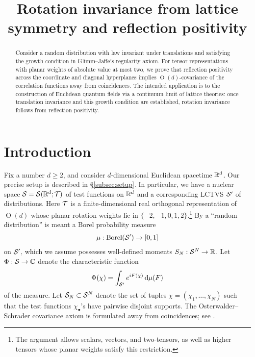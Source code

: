 \newcommand{\dd}{\,\mathrm{d}}
\newcommand{\supp}{\operatorname{supp}}



\title[Rotation invariance from lattice symmetry]{Rotation invariance from lattice symmetry and reflection positivity}
\date{}


	
\begin{abstract}
    Consider a random distribution with law invariant under translations and satisfying the growth condition in Glimm--Jaffe's regularity axiom. For tensor representations with planar weights of absolute value at most two, we prove that reflection positivity across the coordinate and diagonal hyperplanes implies $\operatorname{O}(d)$-covariance of the correlation functions away from coincidences. The intended application is to the construction of Euclidean quantum fields via a continuum limit of lattice theories: once translation invariance and this growth condition are established, rotation invariance follows from reflection positivity. 
\end{abstract}	

\maketitle

\tableofcontents

\section{Introduction}

Fix a number $d\geq 2$, and consider $d$-dimensional Euclidean spacetime $\mathbb{R}^d$. 
Our precise setup is described in \S\ref{subsec:setup}. In particular, we have a nuclear space $\mathcal{S}=\mathcal{S}(\mathbb{R}^d;\mathcal{T})$ of test functions on $\mathbb{R}^d$ and a corresponding LCTVS $\mathcal{S}'$ of distributions. Here $\mathcal{T}$ is a finite-dimensional real orthogonal representation of $\operatorname{O}(d)$ whose planar rotation weights lie in $\{-2,-1,0,1,2\}$.\footnote{The argument allows scalars, vectors, and two-tensors, as well as higher tensors whose planar weights satisfy this restriction.} By a ``random distribution'' is meant a Borel probability measure 
\begin{equation} 
    \mu:\operatorname{Borel}(\mathcal{S}')\to [0,1]
\end{equation} 
on $\mathcal{S}'$, which we assume possesses well-defined moments $S_N: \mathcal{S}^N\to \mathbb{R}$. Let $\Phi:\mathcal{S}\to \mathbb{C}$ denote the characteristic function
\begin{equation}
    \Phi(\chi) = \int_{\calS'} e^{iF(\chi)} \dd \mu(F) 
\end{equation}
of the measure. 
Let $\mathcal{S}_N \subset \mathcal{S}^N$ denote the set of tuples $\chi=(\chi_1,\dots,\chi_N)$ such that the test functions $\chi_\bullet$'s have pairwise disjoint supports. The Osterwalder--Schrader covariance axiom is formulated away from coincidences; see \cite[\S2 and \S3, E1 and Remark~1]{OS}. 

